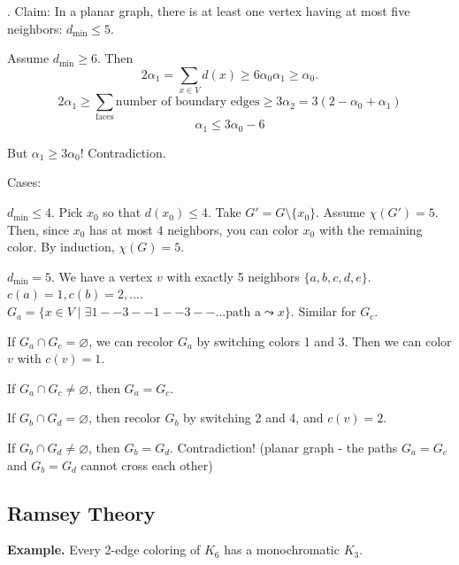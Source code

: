 \def\dmin{\ensuremath{d_{\text{min}}}}
\Proof.
Claim: In a planar graph, there is at least one vertex having at most five neighbors:
$\dmin ≤ 5$.

Assume $\dmin ≥ 6$.
Then
\[
  2\alpha_1 = \sum_{x\in V} d(x) ≥ 6\alpha_0
  \alpha_1 ≥ \alpha_0.
\]
\[
  2\alpha_1 ≥
  \sum_{\text{faces}} \text{number of boundary edges} ≥
  3\alpha_2 =
  3 (2 - \alpha_0 + \alpha_1)
\]
\[
  \alpha_1 ≤ 3\alpha_0 - 6
\]

But $\alpha_1 ≥ 3\alpha_0$! Contradiction.

Cases: \\
\begin{compactenum}
  \item $\dmin \leq 4$. Pick $x_0$ so that $d(x_0) \leq 4$.
Take $G' = G \setminus \{x_0\}$. Assume $\chi(G')=5$. Then, since $x_0$ has at most $4$ neighbors, you can color $x_0$ with the remaining color. By induction, $\chi(G)=5$.

  \item $d_{\text{min}}=5$.
We have a vertex $v$ with exactly 5 neighbors $\{a,b,c,d,e\}$.
$c(a) = 1, c(b) = 2,\ldots$.
\\
$G_a = \{x\in V\mid \exists 1--3--1--3--\ldots \text{path a} \leadsto x\}$.
Similar for $G_c$.
  \begin{compactenum}
    \item If $G_a\cap G_c =\varnothing$, we can recolor $G_a$ by switching colors 1 and 3. Then we can color $v$ with $c(v) = 1$.

    \item If $G_a\cap G_c ≠ \varnothing$, then $G_a = G_c$.
    \begin{compactenum}
      \item If $G_b\cap G_d =\varnothing$, then recolor $G_b$ by switching 2 and 4, and $c(v) = 2$.
      \item If $G_b\cap G_d ≠\varnothing$, then $G_b = G_d$. Contradiction! (planar graph - the paths $G_a=G_c$ and $G_b=G_d$ cannot cross each other)
    \end{compactenum}
  \end{compactenum}
\end{compactenum}

\subsection*{Ramsey Theory}

\textbf{Example.} Every 2-edge coloring of $K_6$ has a monochromatic $K_3$.

